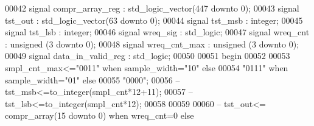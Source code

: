 \begin{DoxyCode}
00042 \textcolor{keywordflow}{signal} \textcolor{vhdlchar}{compr_array_reg}      \textcolor{vhdlchar}{:} \textcolor{comment}{std\_logic\_vector}\textcolor{vhdlchar}{(}\textcolor{vhdllogic}{}\textcolor{vhdllogic}{447} \textcolor{keywordflow}{downto} \textcolor{vhdllogic}{}\textcolor{vhdllogic}{0}\textcolor{vhdlchar}{)};
00043 \textcolor{keywordflow}{signal} \textcolor{vhdlchar}{tst_out}                  \textcolor{vhdlchar}{:} \textcolor{comment}{std\_logic\_vector}\textcolor{vhdlchar}{(}\textcolor{vhdllogic}{}\textcolor{vhdllogic}{63} \textcolor{keywordflow}{downto} \textcolor{vhdllogic}{}\textcolor{vhdllogic}{0}\textcolor{vhdlchar}{)};
00044 \textcolor{keywordflow}{signal} \textcolor{vhdlchar}{tst_msb}                  \textcolor{vhdlchar}{:} \textcolor{comment}{integer};
00045 \textcolor{keywordflow}{signal} \textcolor{vhdlchar}{tst_lsb}                  \textcolor{vhdlchar}{:} \textcolor{comment}{integer};
00046 \textcolor{keywordflow}{signal}  \textcolor{vhdlchar}{wreq_sig}                \textcolor{vhdlchar}{:} \textcolor{comment}{std\_logic};
00047 \textcolor{keywordflow}{signal} \textcolor{vhdlchar}{wreq_cnt}                 \textcolor{vhdlchar}{:} \textcolor{comment}{unsigned} \textcolor{vhdlchar}{(}\textcolor{vhdllogic}{}\textcolor{vhdllogic}{3} \textcolor{keywordflow}{downto} \textcolor{vhdllogic}{}\textcolor{vhdllogic}{0}\textcolor{vhdlchar}{)};
00048 \textcolor{keywordflow}{signal} \textcolor{vhdlchar}{wreq_cnt_max}             \textcolor{vhdlchar}{:} \textcolor{comment}{unsigned} \textcolor{vhdlchar}{(}\textcolor{vhdllogic}{}\textcolor{vhdllogic}{3} \textcolor{keywordflow}{downto} \textcolor{vhdllogic}{}\textcolor{vhdllogic}{0}\textcolor{vhdlchar}{)};
00049 \textcolor{keywordflow}{signal} \textcolor{vhdlchar}{data_in_valid_reg}    \textcolor{vhdlchar}{:} \textcolor{comment}{std\_logic};
00050   
00051 \textcolor{vhdlkeyword}{begin}
00052 
00053   \textcolor{vhdlchar}{smpl_cnt_max}\textcolor{vhdlchar}{<=}\textcolor{vhdllogic}{"0011"} \textcolor{keywordflow}{when} \textcolor{vhdlchar}{sample_width}\textcolor{vhdlchar}{=}\textcolor{vhdllogic}{"10"} \textcolor{keywordflow}{else} 
00054                 \textcolor{vhdllogic}{"0111"} \textcolor{keywordflow}{when} \textcolor{vhdlchar}{sample_width}\textcolor{vhdlchar}{=}\textcolor{vhdllogic}{"01"} \textcolor{keywordflow}{else}
00055                 \textcolor{vhdllogic}{"0000"};
00056 \textcolor{keyword}{--  tst\_msb<=to\_integer(smpl\_cnt*12+11);}
00057 \textcolor{keyword}{--  tst\_lsb<=to\_integer(smpl\_cnt*12);}
00058   
00059   
00060 \textcolor{keyword}{--  tst\_out<= compr\_array(15 downto 0) when wreq\_cnt=0 else }

\end{DoxyCode}
